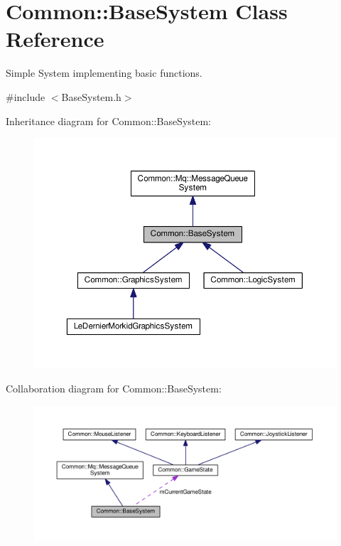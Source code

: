 \hypertarget{class_common_1_1_base_system}{}\section{Common\+:\+:Base\+System Class Reference}
\label{class_common_1_1_base_system}


Simple System implementing basic functions.  




{\ttfamily \#include $<$Base\+System.\+h$>$}



Inheritance diagram for Common\+:\+:Base\+System\+:\nopagebreak
\begin{figure}[H]
\begin{center}
\leavevmode
\includegraphics[width=350pt]{class_common_1_1_base_system__inherit__graph}
\end{center}
\end{figure}


Collaboration diagram for Common\+:\+:Base\+System\+:\nopagebreak
\begin{figure}[H]
\begin{center}
\leavevmode
\includegraphics[width=350pt]{class_common_1_1_base_system__coll__graph}
\end{center}
\end{figure}
